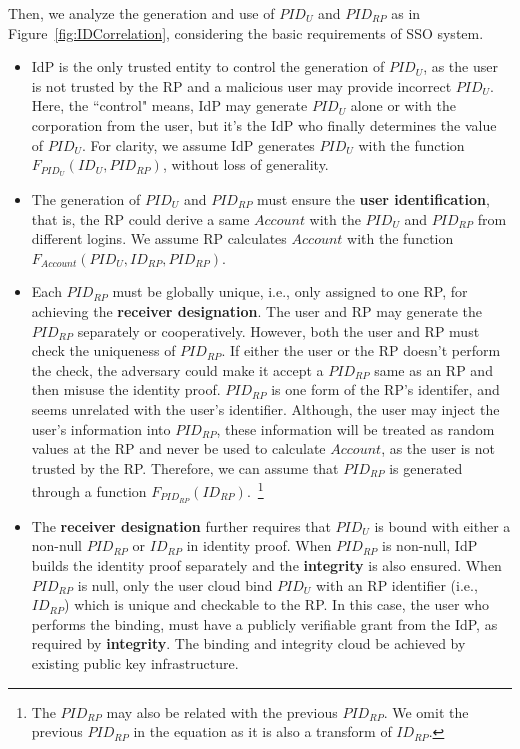 Then, we analyze the generation and use of $PID_U$ and $PID_{RP}$ as in Figure~\ref{fig:IDCorrelation}, considering the basic requirements of SSO system.
\begin{itemize}
  \item %
        IdP is the only trusted entity to control the generation of $PID_U$, as the user is not trusted by the RP and a malicious user may provide incorrect $PID_U$. Here, the ``control" means, IdP may generate $PID_U$ alone or with the corporation from the user, but it's the IdP who finally determines the value of $PID_U$. For clarity, we assume IdP generates $PID_U$ with the function $F_{PID_U}(ID_U, PID_{RP})$, without loss of generality.

  \item %
  The generation of $PID_{U}$ and $PID_{RP}$ must ensure the \textbf{user identification},
  that is, the RP could derive a same $Account$ with the $PID_{U}$ and $PID_{RP}$ from different logins. We assume RP calculates $Account$ with the function $F_{Account}(PID_U, ID_{RP}, PID_{RP})$.

  \item %
  Each $PID_{RP}$ must be globally unique, i.e., only assigned to one RP,  for achieving the \textbf{receiver designation}.
        The user and RP may generate the $PID_{RP}$ separately or cooperatively.
        However, both the user and RP must check the uniqueness of $PID_{RP}$.
        If either the user or the RP doesn't perform the check, the adversary could make it accept a $PID_{RP}$ same as an RP and then misuse the identity proof.
        $PID_{RP}$ is one form of the RP's identifer, and seems unrelated with the user's identifier.
        Although, the user may inject the user's information into $PID_{RP}$, these information will be treated as random values at the RP and never be used to calculate $Account$, as the user is not trusted by the RP.
        Therefore, we can assume that $PID_{RP}$ is generated through a function $F_{PID_{RP}}(ID_{RP})$.~\footnote{The $PID_{RP}$ may also be related with the previous $PID_{RP}$. We omit the previous $PID_{RP}$ in the equation as it is also a transform of $ID_{RP}$.}
  \item The \textbf{receiver designation} further requires that  $PID_{U}$ is bound with either a non-null $PID_{RP}$ or $ID_{RP}$ in identity proof.
        When $PID_{RP}$  is non-null, IdP builds the identity proof separately and the \textbf{integrity} is also ensured.
        When $PID_{RP}$  is null, only the user cloud bind $PID_{U}$ with an RP identifier (i.e., $ID_{RP}$) which is unique and checkable to the RP.
        In this case, the user who performs the binding, must have a publicly verifiable grant from the IdP, as required by \textbf{integrity}.
        The binding and integrity cloud be achieved by existing public key infrastructure.
\end{itemize}

